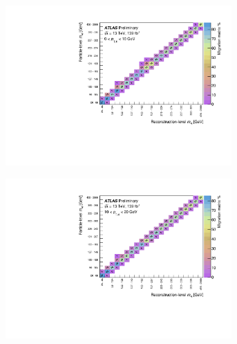 \begin{figure}[htb]
  \centering
  \begin{subfigure}{.49\textwidth}\centering\includegraphics[width = 0.95\textwidth]{Figures/m4l/UnfoldingStudies/v014_matrices/m4l_pt4l0-10Matrix.pdf}\end{subfigure}
  \begin{subfigure}{.49\textwidth}\centering\includegraphics[width = 0.95\textwidth]{Figures/m4l/UnfoldingStudies/v014_matrices/m4l_pt4l10-20Matrix.pdf}\end{subfigure}

\end{figure}
